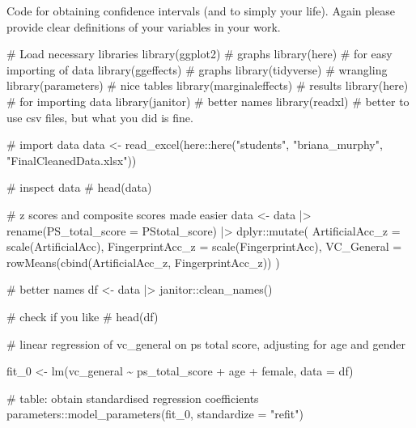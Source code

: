 \documentclass[
  single column]{article}
\newenvironment{Shaded}{\begin{snugshade}}{\end{snugshade}}
\newcommand{\AttributeTok}[1]{\textcolor[rgb]{0.40,0.45,0.13}{#1}}
\newcommand{\CommentTok}[1]{\textcolor[rgb]{0.37,0.37,0.37}{#1}}
\newcommand{\FunctionTok}[1]{\textcolor[rgb]{0.28,0.35,0.67}{#1}}
\newcommand{\NormalTok}[1]{\textcolor[rgb]{0.00,0.23,0.31}{#1}}
\newcommand{\OtherTok}[1]{\textcolor[rgb]{0.00,0.23,0.31}{#1}}
\newcommand{\SpecialCharTok}[1]{\textcolor[rgb]{0.37,0.37,0.37}{#1}}
\newcommand{\StringTok}[1]{\textcolor[rgb]{0.13,0.47,0.30}{#1}}
\begin{document}
Code for obtaining confidence intervals (and to simply your life). Again
please provide clear definitions of your variables in your work.

\begin{Shaded}
\begin{Highlighting}[]
\CommentTok{\# Load necessary libraries}
\FunctionTok{library}\NormalTok{(ggplot2) }\CommentTok{\# graphs}
\FunctionTok{library}\NormalTok{(here) }\CommentTok{\# for easy importing of data}
\FunctionTok{library}\NormalTok{(ggeffects) }\CommentTok{\# graphs}
\FunctionTok{library}\NormalTok{(tidyverse) }\CommentTok{\# wrangling }
\FunctionTok{library}\NormalTok{(parameters) }\CommentTok{\# nice tables}
\FunctionTok{library}\NormalTok{(marginaleffects) }\CommentTok{\# results}
\FunctionTok{library}\NormalTok{(here) }\CommentTok{\# for importing data}
\FunctionTok{library}\NormalTok{(janitor) }\CommentTok{\# better names}
\FunctionTok{library}\NormalTok{(readxl) }\CommentTok{\# better to use csv files, but what you did is fine. }

\CommentTok{\# import data}
\NormalTok{data }\OtherTok{\textless{}{-}} \FunctionTok{read\_excel}\NormalTok{(here}\SpecialCharTok{::}\FunctionTok{here}\NormalTok{(}\StringTok{"students"}\NormalTok{, }\StringTok{"briana\_murphy"}\NormalTok{, }\StringTok{"FinalCleanedData.xlsx"}\NormalTok{))}

\CommentTok{\# inspect data}
\CommentTok{\# head(data)}

\CommentTok{\# z scores and composite scores made easier}
\NormalTok{data }\OtherTok{\textless{}{-}}\NormalTok{ data }\SpecialCharTok{|\textgreater{}} 
  \FunctionTok{rename}\NormalTok{(}\AttributeTok{PS\_total\_score =}\NormalTok{ PStotal\_score) }\SpecialCharTok{|\textgreater{}} 
\NormalTok{  dplyr}\SpecialCharTok{::}\FunctionTok{mutate}\NormalTok{(}
    \AttributeTok{ArtificialAcc\_z =} \FunctionTok{scale}\NormalTok{(ArtificialAcc), }
    \AttributeTok{FingerprintAcc\_z =} \FunctionTok{scale}\NormalTok{(FingerprintAcc),}
    \AttributeTok{VC\_General =} \FunctionTok{rowMeans}\NormalTok{(}\FunctionTok{cbind}\NormalTok{(ArtificialAcc\_z, FingerprintAcc\_z))}
\NormalTok{  )}

\CommentTok{\# better names}
\NormalTok{df }\OtherTok{\textless{}{-}}\NormalTok{ data }\SpecialCharTok{|\textgreater{}} 
\NormalTok{  janitor}\SpecialCharTok{::}\FunctionTok{clean\_names}\NormalTok{()}

\CommentTok{\# check if you like}
\CommentTok{\# head(df)}

\CommentTok{\# linear regression of vc\_general on ps total score, adjusting for age and gender}

\NormalTok{fit\_0 }\OtherTok{\textless{}{-}} \FunctionTok{lm}\NormalTok{(vc\_general  }\SpecialCharTok{\textasciitilde{}}\NormalTok{ ps\_total\_score }\SpecialCharTok{+}\NormalTok{  age }\SpecialCharTok{+}\NormalTok{ female, }\AttributeTok{data =}\NormalTok{ df) }

\CommentTok{\# table: obtain standardised regression coefficients}
\NormalTok{parameters}\SpecialCharTok{::}\FunctionTok{model\_parameters}\NormalTok{(fit\_0, }\AttributeTok{standardize =} \StringTok{"refit"}\NormalTok{) }
\end{Highlighting}
\end{Shaded}
\end{document}
